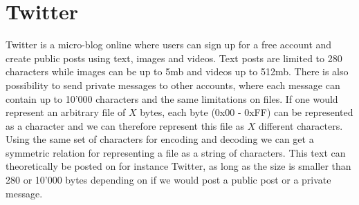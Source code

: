 \section{Twitter}
Twitter is a micro-blog online where users can sign up for a free account and create public posts using text, images and videos. Text posts are limited to 280 characters while images can be up to 5mb and videos up to 512mb\cite{noauthor_media_nodate}. There is also possibility to send private messages to other accounts, where each message can contain up to 10'000 characters and the same limitations on files. If one would represent an arbitrary file of $X$ bytes, each byte (0x00 - 0xFF) can be represented as a character and we can therefore represent this file as $X$ different characters. Using the same set of characters for encoding and decoding we can get a symmetric relation for representing a file as a string of characters. This text can theoretically be posted on for instance Twitter, as long as the size is smaller than 280 or 10'000 bytes depending on if we would post a public post or a private message.